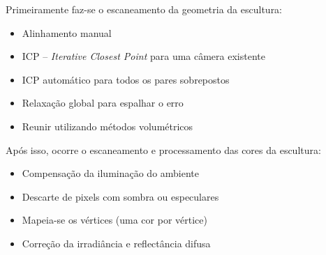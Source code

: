 
Primeiramente faz-se o escaneamento da geometria da escultura:
\begin{itemize}
\item{Alinhamento manual}
\item{ICP -- {\it Iterative Closest Point} para uma câmera existente} %
\item{ICP automático para todos os pares sobrepostos}
\item{Relaxação global para espalhar o erro}
\item{Reunir utilizando métodos volumétricos}
\end{itemize}


Após isso, ocorre o escaneamento e processamento das cores da escultura:

\begin{itemize}
\item{Compensação da iluminação do ambiente}
\item{Descarte de pixels com sombra ou especulares}
\item{Mapeia-se os vértices (uma cor por vértice)}
\item{Correção da irradiância e reflectância difusa}
\end{itemize}

